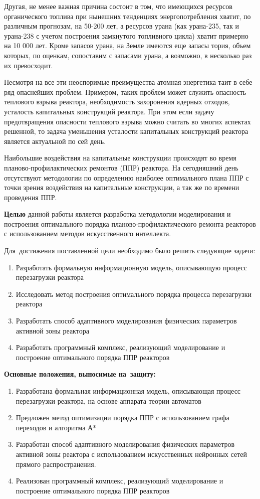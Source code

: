 Другая, не менее важная причина состоит в том, что имеющихся ресурсов органического топлива при нынешних тенденциях энергопотребления хватит, по различным прогнозам, на 50-200 лет, а ресурсов урана (как урана-235, так и урана-238 с учетом построения замкнутого топливного цикла) хватит примерно на 10 000 лет. Кроме запасов урана, на Земле имеются еще запасы тория, объем которых, по оценкам, сопоставим с запасами урана, а возможно, в несколько раз их превосходит.
\cite{Ukr}

Несмотря на все эти неоспоримые преимущества атомная энергетика таит в себе ряд опаснейших проблем.
Примером, таких проблем может служить опасность теплового взрыва реактора, необходимость захоронения ядерных отходов, усталость капитальных конструкций реактора.
При этом если задачу предотвращения опасности теплового взрыва можно считать во многих аспектах решенной, то задача уменьшения усталости капитальных конструкций реактора является актуальной по сей день. 

Наибольшие воздействия на капитальные конструкции происходят во время планово-про\-фи\-лак\-ти\-чес\-ких ремонтов (ППР) реактора. 
На сегодняшний день отсутствуют методологии по определению наиболее оптимального плана ППР с точки зрения воздействия на капитальные конструкции, а так же по времени проведения ППР.

\textbf{Целью} данной работы является разработка методологии моделирования и построения оптимального порядка планово-профилактического ремонта реакторов с использованием методов искусственного интеллекта.

Для~достижения поставленной цели необходимо было решить следующие задачи:
\begin{enumerate}
  \item Разработать формальную информационную модель, описывающую процесс перезагрузки реактора
  \item Исследовать метод построения оптимального порядка процесса перезагрузки реактора
  \item Разработать способ адаптивного моделирования физических параметров активной зоны реактора
  \item Разработать программный комплекс, реализующий моделирование и построение оптимального порядка ППР реакторов
\end{enumerate}

\textbf{Основные положения, выносимые на~защиту:}
\begin{enumerate}
  \item Разработана формальная информационная модель, описывающая процесс перезагрузки реактора, на основе аппарата теории автоматов
  \item Предложен метод оптимизации порядка ППР с использованием графа переходов и алгоритма А*
  \item Разработан способ адаптивного моделирования физических параметров активной зоны реактора с использованием искусственных нейронных сетей прямого распространения.
  \item Реализован программный комплекс, реализующий моделирование и построение оптимального порядка ППР реакторов
\end{enumerate}

